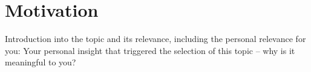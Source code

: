 \section{Motivation}
Introduction into the topic and its relevance, including the personal relevance for you: Your personal insight that triggered the selection of this topic – why is it meaningful to you? \\
\vspace{2cm} \\
\blindtext